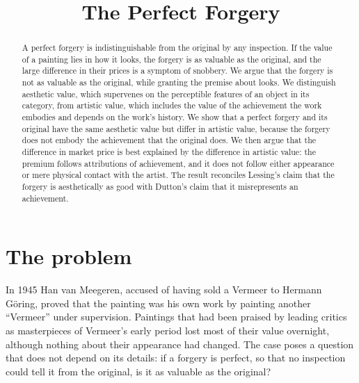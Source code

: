 \documentclass{situationist-preprint}
\title{The Perfect Forgery}
\begin{document}
\maketitle

\begin{abstract}
A perfect forgery is indistinguishable from the original by any inspection. If the value of a painting lies in how it looks, the forgery is as valuable as the original, and the large difference in their prices is a symptom of snobbery. We argue that the forgery is not as valuable as the original, while granting the premise about looks. We distinguish aesthetic value, which supervenes on the perceptible features of an object in its category, from artistic value, which includes the value of the achievement the work embodies and depends on the work's history. We show that a perfect forgery and its original have the same aesthetic value but differ in artistic value, because the forgery does not embody the achievement that the original does. We then argue that the difference in market price is best explained by the difference in artistic value: the premium follows attributions of achievement, and it does not follow either appearance or mere physical contact with the artist. The result reconciles Lessing's claim that the forgery is aesthetically as good with Dutton's claim that it misrepresents an achievement.
\end{abstract}

\section{The problem}

In 1945 Han van Meegeren, accused of having sold a Vermeer to Hermann G\"oring, proved that the painting was his own work by painting another \enquote{Vermeer} under supervision. Paintings that had been praised by leading critics as masterpieces of Vermeer's early period lost most of their value overnight, although nothing about their appearance had changed. The case poses a question that does not depend on its details: if a forgery is perfect, so that no inspection could tell it from the original, is it as valuable as the original?
\end{document}

